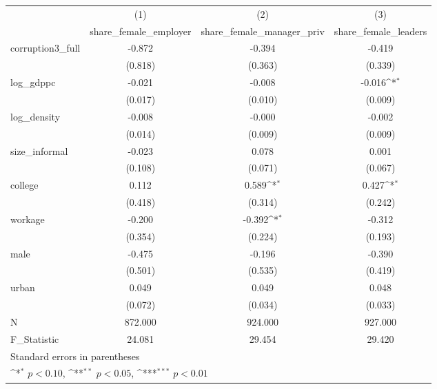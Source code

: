 {
\def\sym#1{\ifmmode^{#1}\else\(^{#1}\)\fi}
\begin{tabular}{l*{3}{c}}
\hline\hline
            &\multicolumn{1}{c}{(1)}&\multicolumn{1}{c}{(2)}&\multicolumn{1}{c}{(3)}\\
            &\multicolumn{1}{c}{share\_female\_employer}&\multicolumn{1}{c}{share\_female\_manager\_priv}&\multicolumn{1}{c}{share\_female\_leaders}\\
\hline
corruption3\_full&      -0.872         &      -0.394         &      -0.419         \\
            &     (0.818)         &     (0.363)         &     (0.339)         \\
[1em]
log\_gdppc   &      -0.021         &      -0.008         &      -0.016\sym{*}  \\
            &     (0.017)         &     (0.010)         &     (0.009)         \\
[1em]
log\_density &      -0.008         &      -0.000         &      -0.002         \\
            &     (0.014)         &     (0.009)         &     (0.009)         \\
[1em]
size\_informal&      -0.023         &       0.078         &       0.001         \\
            &     (0.108)         &     (0.071)         &     (0.067)         \\
[1em]
college     &       0.112         &       0.589\sym{*}  &       0.427\sym{*}  \\
            &     (0.418)         &     (0.314)         &     (0.242)         \\
[1em]
workage     &      -0.200         &      -0.392\sym{*}  &      -0.312         \\
            &     (0.354)         &     (0.224)         &     (0.193)         \\
[1em]
male        &      -0.475         &      -0.196         &      -0.390         \\
            &     (0.501)         &     (0.535)         &     (0.419)         \\
[1em]
urban       &       0.049         &       0.049         &       0.048         \\
            &     (0.072)         &     (0.034)         &     (0.033)         \\
\hline
N           &     872.000         &     924.000         &     927.000         \\
F\_Statistic &      24.081         &      29.454         &      29.420         \\
\hline\hline
\multicolumn{4}{l}{\footnotesize Standard errors in parentheses}\\
\multicolumn{4}{l}{\footnotesize \sym{*} \(p<0.10\), \sym{**} \(p<0.05\), \sym{***} \(p<0.01\)}\\
\end{tabular}
}
